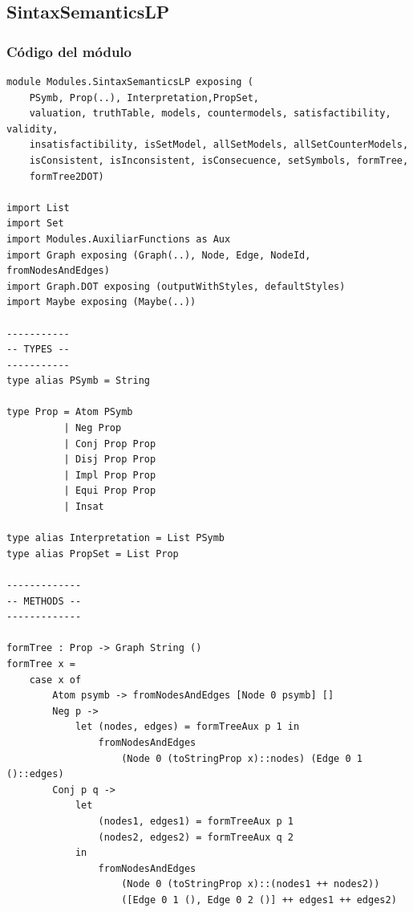 \documentclass[a4paper]{report}
\begin{document}
\subsection{SintaxSemanticsLP}
\subsubsection{Código del módulo}
\begin{lstlisting}[caption={Módulo SintaxSemanticsLP}, mathescape=true]
module Modules.SintaxSemanticsLP exposing (
    PSymb, Prop(..), Interpretation,PropSet,
    valuation, truthTable, models, countermodels, satisfactibility, validity, 	
    insatisfactibility, isSetModel, allSetModels, allSetCounterModels, 
    isConsistent, isInconsistent, isConsecuence, setSymbols, formTree, 
    formTree2DOT)

import List
import Set
import Modules.AuxiliarFunctions as Aux
import Graph exposing (Graph(..), Node, Edge, NodeId, fromNodesAndEdges)
import Graph.DOT exposing (outputWithStyles, defaultStyles)
import Maybe exposing (Maybe(..))

-----------
-- TYPES --
-----------
type alias PSymb = String 

type Prop = Atom PSymb
          | Neg Prop
          | Conj Prop Prop
          | Disj Prop Prop
          | Impl Prop Prop
          | Equi Prop Prop
          | Insat

type alias Interpretation = List PSymb
type alias PropSet = List Prop

-------------
-- METHODS --
-------------

formTree : Prop -> Graph String ()
formTree x =
    case x of
        Atom psymb -> fromNodesAndEdges [Node 0 psymb] []
        Neg p -> 
            let (nodes, edges) = formTreeAux p 1 in
                fromNodesAndEdges 
                    (Node 0 (toStringProp x)::nodes) (Edge 0 1 ()::edges)
        Conj p q -> 
            let 
                (nodes1, edges1) = formTreeAux p 1
                (nodes2, edges2) = formTreeAux q 2
            in
                fromNodesAndEdges 
                    (Node 0 (toStringProp x)::(nodes1 ++ nodes2)) 
                    ([Edge 0 1 (), Edge 0 2 ()] ++ edges1 ++ edges2)


\end{lstlisting}
\end{document}
